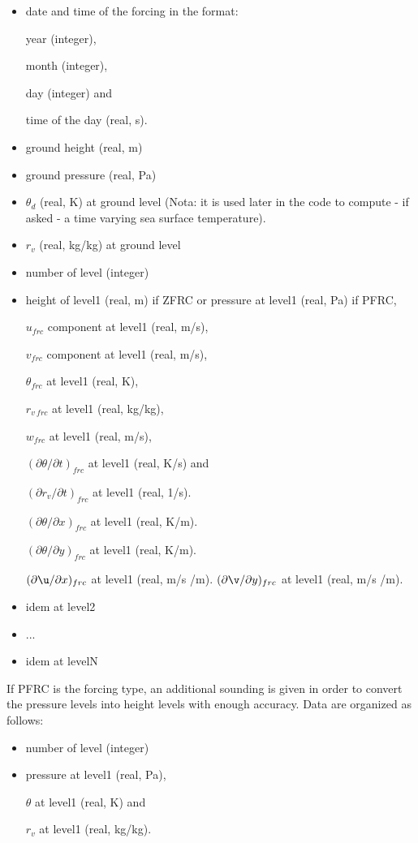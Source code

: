\begin{itemize}
\item date and time of the forcing in the format:

year (integer),

month (integer),

day (integer) and

time of the day (real, s).
\item ground height (real, m)
\item ground pressure (real, Pa) 
\item $\theta_d$ (real, K) at ground level (Nota: it is used later in
the code to compute - if asked - a time varying sea surface temperature).
\item $r_v$ (real, kg/kg) at ground level
\item number of level (integer)
\item height of level1 (real, m) if ZFRC or pressure at level1 (real, Pa) if
PFRC,

$u_{frc}$ component at level1 (real, m/s),

$v_{frc}$ component at level1 (real, m/s),

$\theta_{frc}$ at level1 (real, K),

$r_{v\ frc}$ at level1 (real, kg/kg),

$w_{frc}$ at level1 (real, m/s),

$(\partial\theta / \partial t)_{frc}$ at level1 (real, K/s) and

$(\partial r_v/ \partial t)_{frc}$ at level1 (real, 1/s).

$(\partial\theta/ \partial x)_{frc}$ at level1 (real, K/m).

$(\partial\theta/ \partial y)_{frc}$ at level1 (real, K/m).

$(\partial\u/ \partial x)_{frc}$ at level1 (real, m/s /m).
$(\partial\v/ \partial y)_{frc}$ at level1 (real, m/s /m).

\item idem at level2
\item   ...
\item idem at levelN
\end{itemize}

If PFRC is the forcing type, an additional sounding is given in order to
convert the pressure levels into height levels with enough accuracy. Data
are organized as follows:

\begin{itemize}
\item number of level (integer)
\item pressure at level1 (real, Pa),

$\theta$ at level1 (real, K) and

$r_{v}$ at level1 (real, kg/kg).
\end{itemize}


